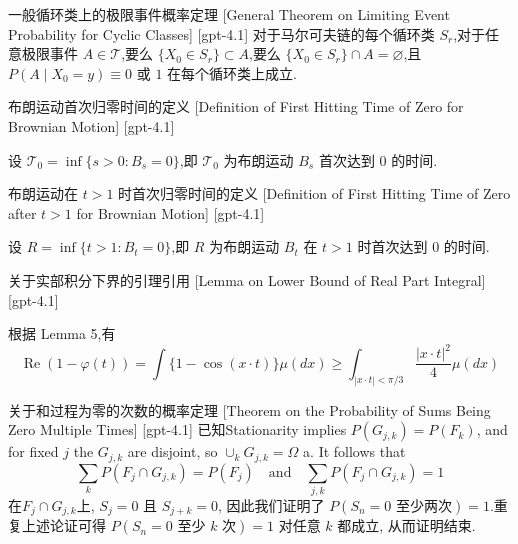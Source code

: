 \documentclass[UTF8]{ctexart}
\begin{document}
    
    
    \begin{thm}
        {一般循环类上的极限事件概率定理}
        [General Theorem on Limiting Event Probability for Cyclic Classes]
        [gpt-4.1]
        对于马尔可夫链的每个循环类 $S_r$,对于任意极限事件 $A \in \mathcal{T}$,要么 $\{ X_0 \in S_r \} \subset A$,要么 $\{ X_0 \in S_r \} \cap A = \varnothing$,且 $P(A \mid X_0 = y) \equiv 0$ 或 $1$ 在每个循环类上成立.
    \end{thm}
    
    
    
    \begin{dfn}
        {布朗运动首次归零时间的定义}
        [Definition of First Hitting Time of Zero for Brownian Motion]
        [gpt-4.1]
        
设 $\mathcal{T}_0 = \inf\{ s > 0 : B_s = 0 \}$,即 $\mathcal{T}_0$ 为布朗运动 $B_s$ 首次达到 $0$ 的时间.

    \end{dfn}
    
    
    
    \begin{dfn}
        {布朗运动在 $t>1$ 时首次归零时间的定义}
        [Definition of First Hitting Time of Zero after $t>1$ for Brownian Motion]
        [gpt-4.1]
        
设 $R = \inf\{ t > 1 : B_t = 0 \}$,即 $R$ 为布朗运动 $B_t$ 在 $t>1$ 时首次达到 $0$ 的时间.

    \end{dfn}
    
    
    
    \begin{lma}
        {关于实部积分下界的引理引用}
        [Lemma on Lower Bound of Real Part Integral]
        [gpt-4.1]
        
根据 Lemma 5,有
\[
\operatorname{Re}(1 - \varphi(t)) = \int \{1 - \cos(x \cdot t)\} \mu(dx) \geq \int_{|x \cdot t| < \pi/3} \frac{|x \cdot t|^{2}}{4} \mu(dx)
\]

    \end{lma}
    
    
    
    \begin{thm}
        {关于和过程为零的次数的概率定理}
        [Theorem on the Probability of Sums Being Zero Multiple Times]
        [gpt-4.1]
        已知Stationarity implies $P(G_{j,k}) = P(F_{k})$, and for fixed $j$ the $G_{j,k}$ are disjoint, so $\cup_{k} G_{j,k} = \Omega$ a. It follows that
\[
\sum_{k} P(F_{j} \cap G_{j,k}) = P(F_{j}) \quad \text{and} \quad \sum_{j,k} P(F_{j} \cap G_{j,k}) = 1
\]
在$F_{j} \cap G_{j,k}$上, $S_{j} = 0$ 且 $S_{j+k} = 0$, 因此我们证明了 $P(S_{n} = 0 \text{ 至少两次}) = 1$.重复上述论证可得 $P(S_{n} = 0 \text{ 至少 } k \text{ 次}) = 1$ 对任意 $k$ 都成立, 从而证明结束.
    \end{thm}
    
\end{document}
